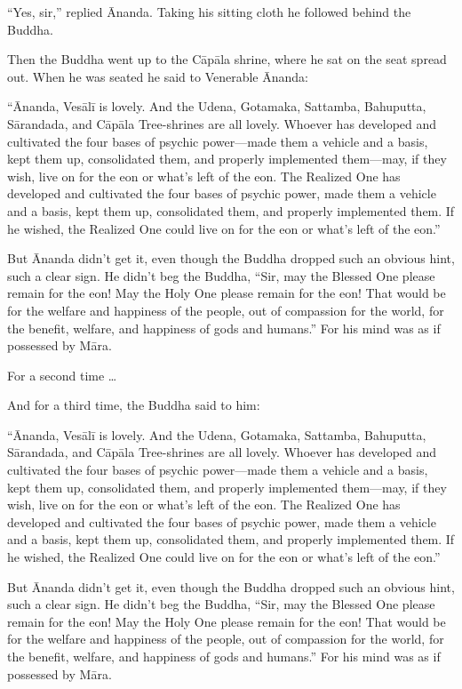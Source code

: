 \documentclass[12pt,openany]{book}%
\begin{document}
“Yes, sir,” replied Ānanda. Taking his sitting cloth he followed behind the Buddha. 

Then the Buddha went up to the \textsanskrit{Cāpāla} shrine, where he sat on the seat spread out. When he was seated he said to Venerable Ānanda: 

“Ānanda, \textsanskrit{Vesālī} is lovely. And the Udena, Gotamaka, Sattamba, Bahuputta, \textsanskrit{Sārandada}, and \textsanskrit{Cāpāla} Tree-shrines are all lovely. Whoever has developed and cultivated the four bases of psychic power—made them a vehicle and a basis, kept them up, consolidated them, and properly implemented them—may, if they wish, live on for the eon or what’s left of the eon. The Realized One has developed and cultivated the four bases of psychic power, made them a vehicle and a basis, kept them up, consolidated them, and properly implemented them. If he wished, the Realized One could live on for the eon or what’s left of the eon.” 

But Ānanda didn’t get it, even though the Buddha dropped such an obvious hint, such a clear sign. He didn’t beg the Buddha, “Sir, may the Blessed One please remain for the eon! May the Holy One please remain for the eon! That would be for the welfare and happiness of the people, out of compassion for the world, for the benefit, welfare, and happiness of gods and humans.” For his mind was as if possessed by \textsanskrit{Māra}. 

For a second time … 

And for a third time, the Buddha said to him: 

“Ānanda, \textsanskrit{Vesālī} is lovely. And the Udena, Gotamaka, Sattamba, Bahuputta, \textsanskrit{Sārandada}, and \textsanskrit{Cāpāla} Tree-shrines are all lovely. Whoever has developed and cultivated the four bases of psychic power—made them a vehicle and a basis, kept them up, consolidated them, and properly implemented them—may, if they wish, live on for the eon or what’s left of the eon. The Realized One has developed and cultivated the four bases of psychic power, made them a vehicle and a basis, kept them up, consolidated them, and properly implemented them. If he wished, the Realized One could live on for the eon or what’s left of the eon.” 

But Ānanda didn’t get it, even though the Buddha dropped such an obvious hint, such a clear sign. He didn’t beg the Buddha, “Sir, may the Blessed One please remain for the eon! May the Holy One please remain for the eon! That would be for the welfare and happiness of the people, out of compassion for the world, for the benefit, welfare, and happiness of gods and humans.” For his mind was as if possessed by \textsanskrit{Māra}. 
\end{document}
